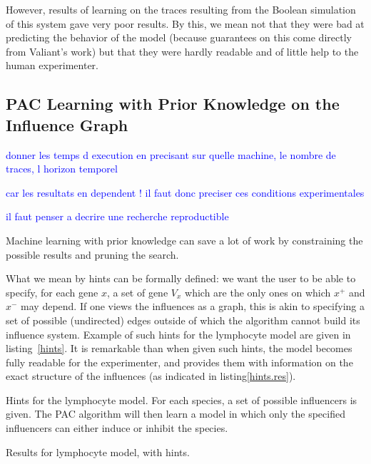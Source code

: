\documentclass{llncs}
\newcommand{\francois}[1]{\textcolor{blue}{#1}}
\begin{document}
However, results of learning on the traces resulting from the Boolean simulation of this system gave very poor results. By this, we mean not that they were bad at predicting the behavior of the model (because guarantees on this come directly from Valiant's work) but that they were hardly readable and of little help to the human experimenter. 

\subsection{PAC Learning with Prior Knowledge on the Influence Graph}

\francois{donner les temps d execution en precisant sur quelle machine, le nombre de traces, l horizon temporel }

\francois{car les resultats en dependent ! il faut donc preciser ces conditions experimentales}

\francois{il faut penser a decrire une recherche reproductible}


Machine learning with prior knowledge can save a lot of work by constraining the possible results and pruning the search.

What we mean by hints can be formally defined: we want the user to be able to specify, for each gene $x$, a set of gene $V_x$ which are the only ones on which $x^+$ and $x^-$ may depend. If one views the influences as a graph, this is akin to specifying a set of possible (undirected) edges outside of which the algorithm cannot build its influence system. Example of such hints for the lymphocyte model are given in listing~\ref{hints}. It is remarkable than when given such hints, the model becomes fully readable for the experimenter, and provides them with information on the exact structure of the influences (as indicated in listing\ref{hints.res}).

\begin{listfig}[htb]
	
	\vspace{-1em}
	\caption{Hints for the lymphocyte model. For each species, a set of possible influencers is given. The PAC algorithm will then learn a model in which only the specified influencers can either induce or inhibit the species.\label{hints}}
\end{listfig}



\begin{listfig}
	
	\caption{Results for lymphocyte model, with hints.\label{hints.res}}
\end{listfig}
\end{document}
